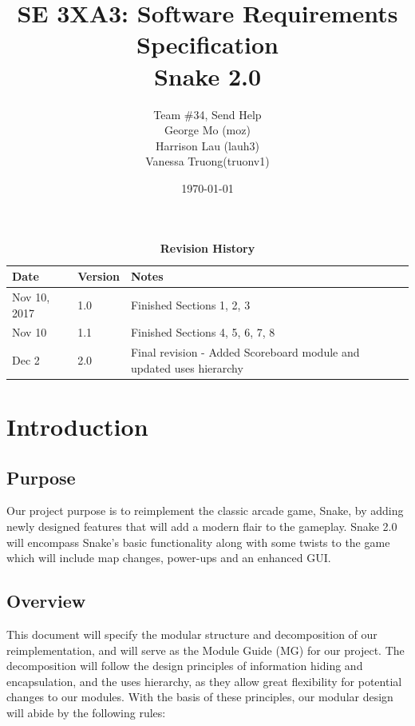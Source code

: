 \documentclass[12pt, titlepage]{article}
\title{SE 3XA3: Software Requirements Specification\\Snake 2.0}
\author{Team \#34, Send Help 
		\\ George Mo (moz)
		\\ Harrison Lau (lauh3)
		\\ Vanessa Truong(truonv1)
}
\date{\today}
\begin{document}
\maketitle

\tableofcontents
\listoftables
\listoffigures

\begin{table}[bp]
\caption{\bf Revision History}
\begin{tabularx}{\textwidth}{p{3cm}p{2cm}X}
\toprule {\bf Date} & {\bf Version} & {\bf Notes}\\
\midrule
Nov 10, 2017 & 1.0 & Finished Sections 1, 2, 3\\
Nov 10 & 1.1 & Finished Sections 4, 5, 6, 7, 8\\
Dec 2 & 2.0 & Final revision - Added Scoreboard module and updated uses hierarchy\\
\bottomrule
\end{tabularx}
\end{table}

\newpage


\section{Introduction}

\subsection{Purpose}

Our project purpose is to reimplement the classic arcade game, Snake, by adding newly designed features that will add a modern flair to the gameplay. 
Snake 2.0 will encompass Snake's basic functionality along with some twists to the game which will include map changes, power-ups and an enhanced GUI.

\subsection{Overview}

This document will specify the modular structure and decomposition of our reimplementation, and will serve as the Module Guide (MG) for our project. The decomposition will follow the design principles of information hiding and encapsulation, and the uses hierarchy, as they allow great flexibility for potential changes to our modules. With the basis of these principles, our modular design will abide by the following rules:
\end{document}
